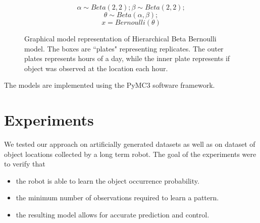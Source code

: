 \noindent
\begin{figure}[htp]

\begin{minipage}{0.3\textwidth}
\centering


\end{minipage}%
\begin{minipage}{0.7\textwidth}

\begin{equation*}
	\alpha \sim Beta(2,2) ; \beta \sim Beta(2, 2);
\end{equation*}
\begin{equation*}
	\theta \sim Beta(\alpha, \beta);
\end{equation*}
\begin{equation*}
	x = Bernoulli(\theta)
\end{equation*}
\end{minipage}
\caption[Hierarchical Beta Bernoulli graphical model]{Graphical model representation of Hierarchical Beta Bernoulli model. The boxes are ``plates" representing replicates. The outer plates represents hours of a day, while the inner plate represents if object was observed at the location each hour.}
\label{bbm}
\end{figure}

The models are implemented using the PyMC3 software framework.

\FloatBarrier
\section{Experiments}

We tested our approach on artificially generated datasets as well as on dataset of object locations collected by a long term robot.
The goal of the experiments were to verify that
\begin{itemize}
    \item the robot is able to learn the object occurrence probability.
	\item the minimum number of observations required to learn a pattern.
	\item the resulting model allows for accurate prediction and control.
\end{itemize}

